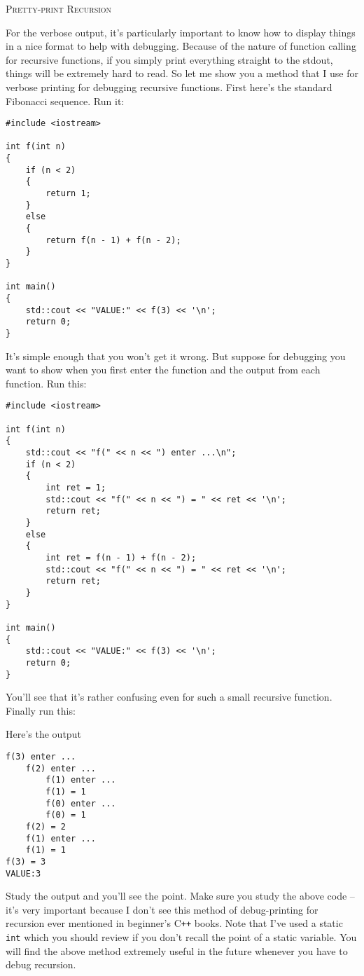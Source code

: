 \textsc{Pretty-print Recursion}

For the verbose output, it's particularly important to know how to display
things in a nice format to help with debugging.
Because of the nature of function calling for recursive functions,
if you simply print everything straight to the stdout, things will be extremely
hard to read.
So let me show you a method that I use for verbose printing for debugging
recursive functions.
First here's the standard Fibonacci sequence. Run it:
\begin{Verbatim}[frame=single,fontsize=\footnotesize]
#include <iostream>

int f(int n)
{
    if (n < 2)
    {
        return 1;
    }
    else
    {
        return f(n - 1) + f(n - 2);
    }
}

int main()
{
    std::cout << "VALUE:" << f(3) << '\n';
    return 0;
}
\end{Verbatim}
It's simple enough that you won't get it wrong.
But suppose for debugging you want to show when you first enter the function and the output from each function.
Run this: 
\begin{Verbatim}[frame=single,fontsize=\footnotesize]
#include <iostream>

int f(int n)
{
    std::cout << "f(" << n << ") enter ...\n";
    if (n < 2)
    {
        int ret = 1;
        std::cout << "f(" << n << ") = " << ret << '\n';
        return ret;
    }
    else
    {
        int ret = f(n - 1) + f(n - 2);
        std::cout << "f(" << n << ") = " << ret << '\n';
        return ret;
    }
}

int main()
{
    std::cout << "VALUE:" << f(3) << '\n';
    return 0;
}
\end{Verbatim}
You'll see that it's rather confusing even for such a small recursive function.
Finally run this:
{\footnotesize
{}
}

Here's the output
\begin{Verbatim}[frame=single,fontsize=\footnotesize]
f(3) enter ...
    f(2) enter ...
        f(1) enter ...
        f(1) = 1
        f(0) enter ...
        f(0) = 1
    f(2) = 2
    f(1) enter ...
    f(1) = 1
f(3) = 3
VALUE:3
\end{Verbatim}

Study the output and you'll see the point.
Make sure you study the above code -- it's very important because
I don't see this method of debug-printing for recursion ever mentioned in
beginner's C\texttt{++} books.
Note that I've used a static \verb!int! which you should review 
if you don't recall the point of a static variable.
You will find the above method extremely useful in the future whenever you
have to debug recursion.
